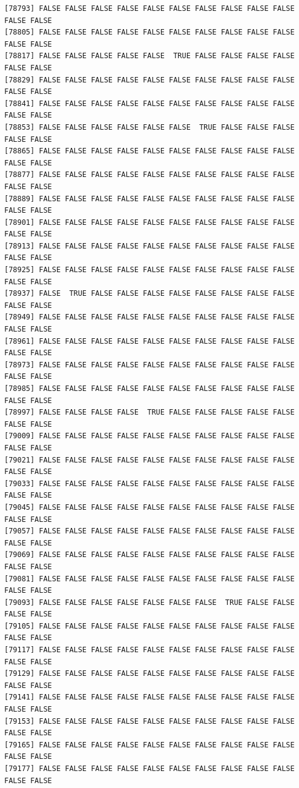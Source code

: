 \documentclass[
  a4paper,
  DIV=11,
  numbers=noendperiod]{scrartcl}
\begin{document}
\begin{verbatim}
[78793] FALSE FALSE FALSE FALSE FALSE FALSE FALSE FALSE FALSE FALSE FALSE FALSE
[78805] FALSE FALSE FALSE FALSE FALSE FALSE FALSE FALSE FALSE FALSE FALSE FALSE
[78817] FALSE FALSE FALSE FALSE FALSE  TRUE FALSE FALSE FALSE FALSE FALSE FALSE
[78829] FALSE FALSE FALSE FALSE FALSE FALSE FALSE FALSE FALSE FALSE FALSE FALSE
[78841] FALSE FALSE FALSE FALSE FALSE FALSE FALSE FALSE FALSE FALSE FALSE FALSE
[78853] FALSE FALSE FALSE FALSE FALSE FALSE  TRUE FALSE FALSE FALSE FALSE FALSE
[78865] FALSE FALSE FALSE FALSE FALSE FALSE FALSE FALSE FALSE FALSE FALSE FALSE
[78877] FALSE FALSE FALSE FALSE FALSE FALSE FALSE FALSE FALSE FALSE FALSE FALSE
[78889] FALSE FALSE FALSE FALSE FALSE FALSE FALSE FALSE FALSE FALSE FALSE FALSE
[78901] FALSE FALSE FALSE FALSE FALSE FALSE FALSE FALSE FALSE FALSE FALSE FALSE
[78913] FALSE FALSE FALSE FALSE FALSE FALSE FALSE FALSE FALSE FALSE FALSE FALSE
[78925] FALSE FALSE FALSE FALSE FALSE FALSE FALSE FALSE FALSE FALSE FALSE FALSE
[78937] FALSE  TRUE FALSE FALSE FALSE FALSE FALSE FALSE FALSE FALSE FALSE FALSE
[78949] FALSE FALSE FALSE FALSE FALSE FALSE FALSE FALSE FALSE FALSE FALSE FALSE
[78961] FALSE FALSE FALSE FALSE FALSE FALSE FALSE FALSE FALSE FALSE FALSE FALSE
[78973] FALSE FALSE FALSE FALSE FALSE FALSE FALSE FALSE FALSE FALSE FALSE FALSE
[78985] FALSE FALSE FALSE FALSE FALSE FALSE FALSE FALSE FALSE FALSE FALSE FALSE
[78997] FALSE FALSE FALSE FALSE  TRUE FALSE FALSE FALSE FALSE FALSE FALSE FALSE
[79009] FALSE FALSE FALSE FALSE FALSE FALSE FALSE FALSE FALSE FALSE FALSE FALSE
[79021] FALSE FALSE FALSE FALSE FALSE FALSE FALSE FALSE FALSE FALSE FALSE FALSE
[79033] FALSE FALSE FALSE FALSE FALSE FALSE FALSE FALSE FALSE FALSE FALSE FALSE
[79045] FALSE FALSE FALSE FALSE FALSE FALSE FALSE FALSE FALSE FALSE FALSE FALSE
[79057] FALSE FALSE FALSE FALSE FALSE FALSE FALSE FALSE FALSE FALSE FALSE FALSE
[79069] FALSE FALSE FALSE FALSE FALSE FALSE FALSE FALSE FALSE FALSE FALSE FALSE
[79081] FALSE FALSE FALSE FALSE FALSE FALSE FALSE FALSE FALSE FALSE FALSE FALSE
[79093] FALSE FALSE FALSE FALSE FALSE FALSE FALSE  TRUE FALSE FALSE FALSE FALSE
[79105] FALSE FALSE FALSE FALSE FALSE FALSE FALSE FALSE FALSE FALSE FALSE FALSE
[79117] FALSE FALSE FALSE FALSE FALSE FALSE FALSE FALSE FALSE FALSE FALSE FALSE
[79129] FALSE FALSE FALSE FALSE FALSE FALSE FALSE FALSE FALSE FALSE FALSE FALSE
[79141] FALSE FALSE FALSE FALSE FALSE FALSE FALSE FALSE FALSE FALSE FALSE FALSE
[79153] FALSE FALSE FALSE FALSE FALSE FALSE FALSE FALSE FALSE FALSE FALSE FALSE
[79165] FALSE FALSE FALSE FALSE FALSE FALSE FALSE FALSE FALSE FALSE FALSE FALSE
[79177] FALSE FALSE FALSE FALSE FALSE FALSE FALSE FALSE FALSE FALSE FALSE FALSE

\end{verbatim}
\end{document}
